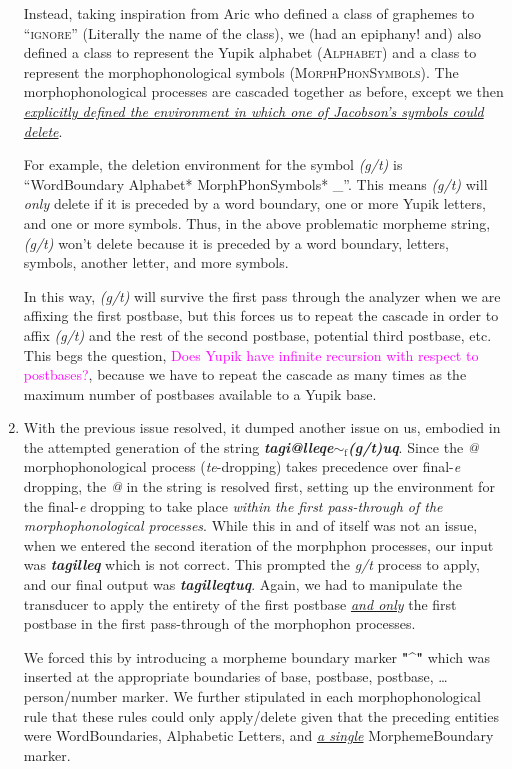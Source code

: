 \documentclass{article}
\begin{document}
\begin{enumerate}
Instead, taking inspiration from Aric who defined a class of graphemes to ``\textsc{ignore}'' (Literally the name of the class), we (had an epiphany! and) also defined a class to represent the Yupik alphabet (\textsc{Alphabet}) and a class to represent the morphophonological symbols (\textsc{MorphPhonSymbols}). The morphophonological processes are cascaded together as before, except we then \textit{\uline{explicitly defined the environment in which one of Jacobson's symbols could delete}}.

For example, the deletion environment for the symbol \textit{(g/t)} is ``WordBoundary Alphabet* MorphPhonSymbols* \_''. This means \textit{(g/t)} will \textit{only} delete if it is preceded by a word boundary, one or more Yupik letters, and one or more symbols. Thus, in the above problematic morpheme string, \textit{(g/t)} won't delete because it is preceded by a word boundary, letters, symbols, another letter, and more symbols.

In this way, \textit{(g/t)} will survive the first pass through the analyzer when we are affixing the first postbase, but this forces us to repeat the cascade in order to affix \textit{(g/t)} and the rest of the second postbase, potential third postbase, etc. This begs the question, \textcolor{magenta}{Does Yupik have infinite recursion with respect to postbases?}, because we have to repeat the cascade as many times as the maximum number of postbases available to a Yupik base.

\item With the previous issue resolved, it dumped another issue on us, embodied in the attempted generation of the string \textit{\textbf{tagi@lleqe${\sim}_\text{f}$(g/t)uq}}. Since the \textit{@} morphophonological process (\textit{te}-dropping) takes precedence over final-\textit{e} dropping, the \textit{@} in the string is resolved first, setting up the environment for the final-\textit{e} dropping to take place \textit{within the first pass-through of the morphophonological processes}. While this in and of itself was not an issue, when we entered the second iteration of the morphphon processes, our input was \textit{\textbf{tagilleq}} which is not correct. This prompted the \textit{g/t} process to apply, and our final output was \textit{\textbf{tagilleqtuq}}. Again, we had to manipulate the transducer to apply the entirety of the first postbase \textit{\uline{and only}} the first postbase in the first pass-through of the morphophon processes.

We forced this by introducing a morpheme boundary marker \textbf{"\textasciicircum"} which was inserted at the appropriate boundaries of base, postbase, postbase, \ldots person/number marker. We further stipulated in each morphophonological rule that these rules could only apply/delete given that the preceding entities were WordBoundaries, Alphabetic Letters, and \textit{\uline{a single}} MorphemeBoundary marker.


\end{enumerate}
\end{document}
